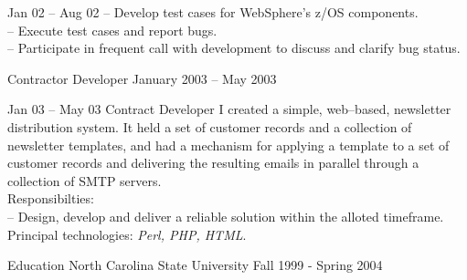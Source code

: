 \documentclass[letterpaper, 11pt]{article}
\begin{document}
\begin{resume}
\begin{block}
\begin{subcategory}{Jan 02 -- Aug 02}
                -- Develop test cases for WebSphere's z/OS components. \\
                -- Execute test cases and report bugs. \\
                -- Participate in frequent call with development to discuss and clarify bug status.
                \bigskip
                \bigskip
            \end{subcategory}
        \end{block}
        \begin{block}
            \begin{category}{}
                 {Contractor Developer}
                         {}               {January 2003 -- May 2003}
                \smallskip
            \end{category}
            \begin{subcategory}{Jan 03 -- May 03}
                 {Contract Developer}
                I created a simple, web--based, newsletter distribution system.
                It held a set of customer records and a collection of newsletter templates,
                and had a mechanism for applying a template to a set of customer records and
                delivering the resulting emails in parallel through a collection of SMTP servers.
                \\[1ex]
                Responsibilties: \\
                -- Design, develop and deliver a reliable solution within the alloted timeframe.
                \\[1ex]
                Principal technologies: \emph{Perl, PHP, HTML}.
                \bigskip
                \bigskip
            \end{subcategory}
        \end{block}
        \begin{block}
            \begin{category}{Education}
                 {North Carolina State University}
                         { }                        {Fall 1999 - Spring 2004}
            \end{category}
        \end{block}
    \end{resume}
\end{document}
